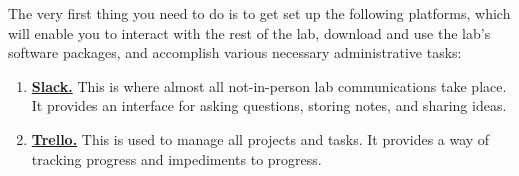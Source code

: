 \documentclass{tufte-book} %
\begin{document}
\noindent
{}The very first thing you need to do is to get set
up the following platforms, which will enable you to interact with the
rest of the lab, download and use the lab's software packages, and
accomplish various necessary administrative tasks:
\begin{enumerate}
\item \href{https://context-lab.slack.com}{\textbf{Slack.}}  This is where
  almost all not-in-person lab communications take place.  It provides
  an interface for asking questions, storing notes, and sharing
  ideas.

\item \href{https://www.trello.com}{\textbf{Trello.}}
    This is used to manage all projects and tasks.  It
  provides a way of tracking progress and impediments to progress.


\end{enumerate}
\end{document}
